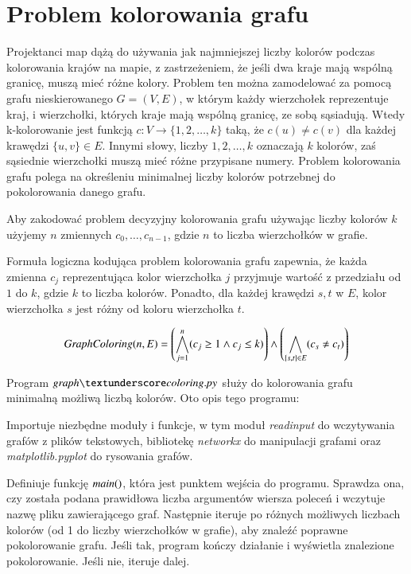 \section{Problem kolorowania grafu}
Projektanci map dążą do używania jak najmniejszej liczby kolorów podczas
kolorowania krajów na mapie, z zastrzeżeniem, że jeśli dwa kraje mają wspólną
granicę, muszą mieć różne kolory. Problem ten można zamodelować za pomocą grafu
nieskierowanego $G = (V, E)$, w którym każdy wierzchołek reprezentuje kraj,
i wierzchołki, których kraje mają wspólną granicę, ze sobą sąsiadują.
Wtedy k-kolorowanie jest funkcją $c\colon V \to \{1, 2, …, k\}$ taką, że $c(u) \neq c(v)$ dla każdej krawędzi $\{u, v\} \in E$. 
Innymi słowy, liczby $1, 2, …, k$
oznaczają \(k\) kolorów, zaś sąsiednie wierzchołki muszą mieć różne przypisane
numery. Problem kolorowania grafu polega na określeniu minimalnej liczby kolorów
potrzebnej do pokolorowania danego grafu.

Aby zakodować problem decyzyjny kolorowania grafu używając liczby kolorów $k$ użyjemy $n$ zmiennych $c_0,\ldots,c_{n-1}$, gdzie $n$ to liczba wierzchołków w grafie.

Formuła logiczna kodująca problem kolorowania grafu zapewnia, że każda zmienna \(c_j\) reprezentująca kolor wierzchołka \(j\) przyjmuje wartość z przedziału od \(1\) do \(k\), gdzie \(k\) to liczba kolorów. Ponadto, dla każdej krawędzi ${s, t}$ w \(E\), kolor wierzchołka \(s\) jest różny od koloru wierzchołka \(t\).

\begin{align*}
	{\mathit{GraphColoring}}(n, E) = \left( \bigwedge_{j=1}^{n} (c_j \geq 1 \land c_j \leq k) \right) \land 
	\left( \bigwedge_{\{s,t\} \in E} (c_s \neq c_t) \right)
\end{align*}

Program $\graphcoloring$ służy do kolorowania grafu minimalną możliwą liczbą kolorów. Oto opis tego programu:

Importuje niezbędne moduły i funkcje, w tym moduł \textit{read\textunderscore input} do wczytywania grafów z plików tekstowych, bibliotekę \textit{networkx} do manipulacji grafami oraz \textit{matplotlib.pyplot} do rysowania grafów.

Definiuje funkcję ${\mathit{main()}}$, która jest punktem wejścia do programu. Sprawdza ona, czy została podana prawidłowa liczba argumentów wiersza poleceń i wczytuje nazwę pliku zawierającego graf. Następnie iteruje po różnych możliwych liczbach kolorów (od 1 do liczby wierzchołków w grafie), aby znaleźć poprawne pokolorowanie grafu. Jeśli tak, program kończy działanie i wyświetla znalezione pokolorowanie. Jeśli nie, iteruje dalej.

